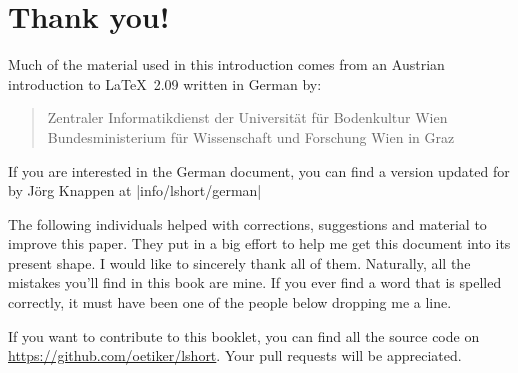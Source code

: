 %
%
%
%


\chapter{Thank you!}
\noindent Much of the material used in this introduction comes from an
Austrian introduction to \LaTeX\ 2.09 written in German by:
\begin{verse}
  {Zentraler Informatikdienst der Universit\"at f\"ur Bodenkultur Wien}
  {Bundesministerium f\"ur Wissenschaft und Forschung Wien}
  {in Graz}
\end{verse}

If you are interested in the German document, you can find a version
updated for \LaTeXe{} by J\"org Knappen at
\CTAN|info/lshort/german|

\newpage \noindent The
following individuals helped with corrections, suggestions and
material to improve this paper. They put in a big effort to help me
get this document into its present shape. I would like to
sincerely thank all of them. Naturally, all the mistakes you'll find
in this book are mine. If you ever find a word that is spelled
correctly, it must have been one of the people below dropping me a
line.

If you want to contribute to this booklet, you can find all the source code
on \url{https://github.com/oetiker/lshort}. Your pull requests will be
appreciated.

